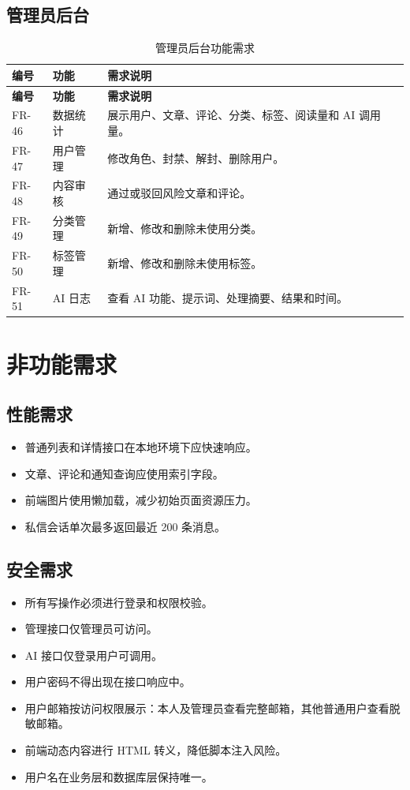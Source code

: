 \documentclass[UTF8,a4paper,12pt]{ctexart}
\begin{document}
\subsection{管理员后台}

\begin{longtable}{>{\centering\arraybackslash}p{2.1cm}p{3.3cm}p{8.6cm}}
\caption{管理员后台功能需求}\\
\toprule
\rowcolor{tablehead}\textbf{编号} & \textbf{功能} & \textbf{需求说明}\\
\midrule
\endfirsthead
\toprule
\rowcolor{tablehead}\textbf{编号} & \textbf{功能} & \textbf{需求说明}\\
\midrule
\endhead
FR-46 & 数据统计 & 展示用户、文章、评论、分类、标签、阅读量和 AI 调用量。\\
FR-47 & 用户管理 & 修改角色、封禁、解封、删除用户。\\
FR-48 & 内容审核 & 通过或驳回风险文章和评论。\\
FR-49 & 分类管理 & 新增、修改和删除未使用分类。\\
FR-50 & 标签管理 & 新增、修改和删除未使用标签。\\
FR-51 & AI 日志 & 查看 AI 功能、提示词、处理摘要、结果和时间。\\
\bottomrule
\end{longtable}

\section{非功能需求}

\subsection{性能需求}

\begin{itemize}
  \item 普通列表和详情接口在本地环境下应快速响应。
  \item 文章、评论和通知查询应使用索引字段。
  \item 前端图片使用懒加载，减少初始页面资源压力。
  \item 私信会话单次最多返回最近 200 条消息。
\end{itemize}

\subsection{安全需求}

\begin{itemize}
  \item 所有写操作必须进行登录和权限校验。
  \item 管理接口仅管理员可访问。
  \item AI 接口仅登录用户可调用。
  \item 用户密码不得出现在接口响应中。
  \item 用户邮箱按访问权限展示：本人及管理员查看完整邮箱，其他普通用户查看脱敏邮箱。
  \item 前端动态内容进行 HTML 转义，降低脚本注入风险。
  \item 用户名在业务层和数据库层保持唯一。
\end{itemize}
\end{document}
